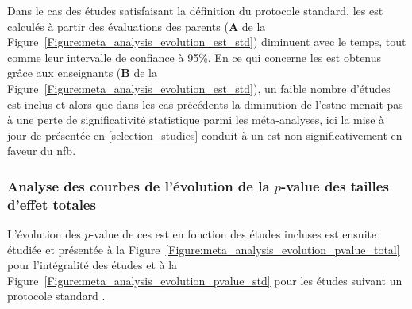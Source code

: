 Dans le cas des études satisfaisant la définition du protocole standard, les \gls{est} calculés à partir des évaluations des parents 
(\textbf{A} de la Figure~\ref{Figure:meta_analysis_evolution_est_std}) diminuent avec le temps, tout comme leur intervalle de confiance à 95\%. 
En ce qui concerne les \gls{est} obtenus grâce aux enseignants (\textbf{B} de la Figure~\ref{Figure:meta_analysis_evolution_est_std}), un faible nombre d'études 
est inclus et alors que dans les cas précédents la diminution de l'\gls{est}ne menait pas à une perte de significativité statistique parmi les méta-analyses, 
ici la mise à jour de \citet{Cortese2016} présentée en \ref{selection_studies} conduit à un \gls{est} non significativement en faveur du \gls{nfb}. 

\subsubsection{Analyse des courbes de l'évolution de la $p$-value des tailles d'effet totales}

L'évolution des $p$-value de ces \gls{est} en fonction des études incluses est ensuite étudiée et présentée à la Figure~\ref{Figure:meta_analysis_evolution_pvalue_total} pour 
l'intégralité des études et à la Figure~\ref{Figure:meta_analysis_evolution_pvalue_std} pour les études suivant un protocole standard \citep{Arns2014}.

